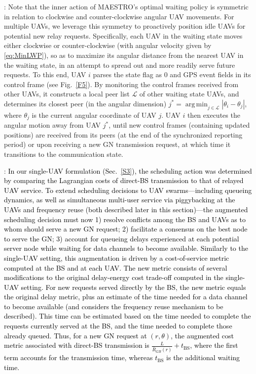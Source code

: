 \documentclass[10pt, twocolumn]{IEEEtran}
\theoremstyle{plain}
\theoremstyle{definition}
\theoremstyle{remark}
\DeclareMathOperator*{\argmin}{arg\,min}
\newcommand\hlt[1]{\textcolor{black}{#1}}
\begin{document}
: Note that the inner action of MAESTRO's optimal waiting policy is symmetric in relation to clockwise and counter-clockwise angular UAV movements. For multiple UAVs, we leverage this symmetry to proactively position idle UAVs for potential new relay requests. Specifically, each UAV in the waiting state moves either clockwise or counter-clockwise (with angular velocity given by \eqref{eq:MinLWP}), so as to maximize its angular distance from the nearest UAV in the waiting state, in an attempt to spread out and more readily serve future requests. To this end, UAV $i$ parses the state flag as 0 and GPS event fields in its control frame (see Fig.~\ref{F5}). By monitoring the control frames received from other UAVs, it constructs a local peer list $\mathcal{L}$ of other waiting state UAVs, and determines its closest peer (in the angular dimension) $j^{*}{=}\argmin_{j{\in}\mathcal{L}}|\theta_{i}{-}\theta_{j}|$, where $\theta_{j}$ is the current angular coordinate of UAV $j$. UAV $i$ then executes the angular motion away from UAV $j^*$, until new control frames (containing updated positions) are received from its peers (at the end of the synchronized reporting period) or upon receiving a new GN transmission request, at which time it transitions to the communication state.

\noindent{\textbf{\hlt{Consensus-driven Conflict Resolution}}}: \hlt{In our single-UAV formulation (Sec.~\ref{S3}), the scheduling action was determined by comparing the Lagrangian costs of direct-BS transmission to that of relayed UAV service. To extend scheduling decisions to UAV swarms---including queueing dynamics, as well as simultaneous multi-user service via piggybacking at the UAVs and frequency reuse (both described later in this section)---the augmented scheduling decision must now 1) resolve conflicts among the BS and UAVs as to whom should serve a new GN request; 2) facilitate a consensus on the best node to serve the GN; 3) account for queueing delays experienced at each potential server node while waiting for data channels to become available. Similarly to the single-UAV setting, this augmentation is driven by a cost-of-service metric computed at the BS and at each UAV. The new metric consists of several modifications to the original delay-energy cost trade-off computed in the single-UAV setting. For new requests served directly by the BS, the new metric equals the original delay metric, plus an estimate of the time needed for a data channel to become available (and considers the frequency reuse mechanism to be described). This time can be estimated based on the time needed to complete the requests currently served at the BS, and the time needed to complete those already queued. Thus, for a new GN request at $(r,\theta)$, the augmented cost metric associated with direct-BS transmission is $\frac{L}{\bar{R}_{GB}(r)}{+}t_{\mathrm{BS}}$, where the first term accounts for the transmission time, whereas $t_{\mathrm{BS}}$ is the additional waiting time.}
\end{document}
